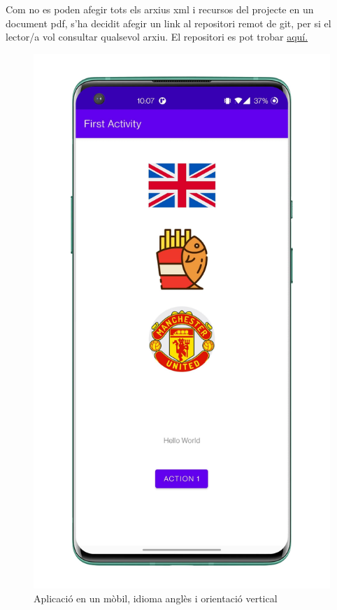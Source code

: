 \documentclass[12pt, letterpaper]{article}
\begin{document}
Com no es poden afegir tots els arxius xml i recursos del projecte en un document pdf, s'ha decidit afegir un link al repositori remot de git, per si el lector/a vol consultar qualsevol arxiu. El repositori es pot trobar \href{https://github.com/Pablito2020/First-Activity}{aquí.}

\begin{figure}[!htbp]
    \includegraphics[scale = 0.12]{smartphone-vertical.jpg}
    \centering
    \caption{Aplicació en un mòbil, idioma anglès i orientació vertical}
    \label{vertical}
\end{figure}
\end{document}
